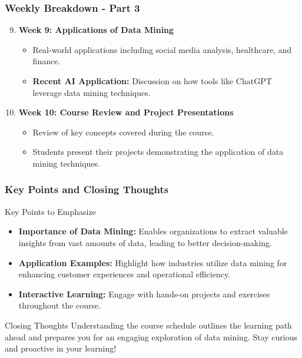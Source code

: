 \documentclass[aspectratio=169]{beamer}
\begin{document}
\begin{frame}[fragile]
    \frametitle{Weekly Breakdown - Part 3}
    \begin{enumerate}
        \setcounter{enumi}{8} %
        \item \textbf{Week 9: Applications of Data Mining}
            \begin{itemize}
                \item Real-world applications including social media analysis, healthcare, and finance.
                \item \textbf{Recent AI Application:} Discussion on how tools like ChatGPT leverage data mining techniques.
            \end{itemize}
        \item \textbf{Week 10: Course Review and Project Presentations}
            \begin{itemize}
                \item Review of key concepts covered during the course.
                \item Students present their projects demonstrating the application of data mining techniques.
            \end{itemize}
    \end{enumerate}
\end{frame}

\begin{frame}[fragile]
    \frametitle{Key Points and Closing Thoughts}
    \begin{block}{Key Points to Emphasize}
        \begin{itemize}
            \item \textbf{Importance of Data Mining:} Enables organizations to extract valuable insights from vast amounts of data, leading to better decision-making.
            \item \textbf{Application Examples:} Highlight how industries utilize data mining for enhancing customer experiences and operational efficiency.
            \item \textbf{Interactive Learning:} Engage with hands-on projects and exercises throughout the course.
        \end{itemize}
    \end{block}

    \begin{block}{Closing Thoughts}
        Understanding the course schedule outlines the learning path ahead and prepares you for an engaging exploration of data mining. Stay curious and proactive in your learning!
    \end{block}
\end{frame}
\end{document}
